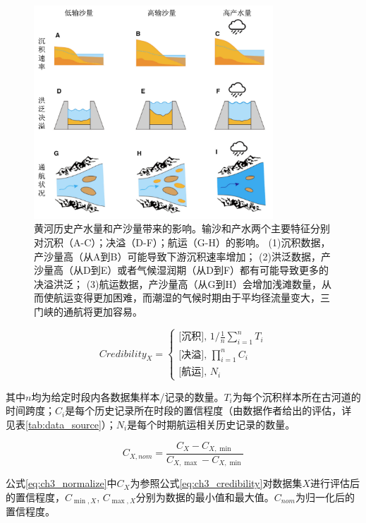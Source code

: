 \begin{figure}[!h] %
    \centering
    \includegraphics[width=0.8\textwidth]{img/ch3/ch3_impacts_diagram.png}
    \caption[黄河历史产水量和产沙量变化的影响]{黄河历史产水量和产沙量带来的影响。输沙和产水两个主要特征分别对沉积（A-C）；决溢（D-F）；航运（G-H）的影响。
    (1)沉积数据，产沙量高（从A到B）可能导致下游沉积速率增加\cite{xu2003,yeqingchao1994}；
    (2)洪泛数据，产沙量高（从D到E）或者气候湿润期（从D到F）都有可能导致更多的决溢洪泛\cite{chen2012}；
    (3)航运数据，产沙量高（从G到H）会增加浅滩数量，从而使航运变得更加困难，而潮湿的气候时期由于平均径流量变大，三门峡的通航将更加容易\cite{WangShouChun1993}。}\label{fig:ch3:impacts_diagram}
\end{figure}



\begin{equation}
    \label{eq:ch3_credibility}
    Credibility_X = 
    \left\{\begin{array}{l}
        \text{[沉积], } 1 / \frac{1}{n} \sum_{i=1}^n T_i\\
        \text{[决溢], } \prod_{i=1}^n C_i\\
        \text{[航运], } N_i
    \end{array}\right.
\end{equation}    

其中$n$均为给定时段内各数据集样本/记录的数量。$T_i$为每个沉积样本所在古河道的时间跨度；$C_i$是每个历史记录所在时段的置信程度（由数据作者给出的评估，详见表\ref{tab:data_source}）；$N_i$是每个时期航运相关历史记录的数量。

\begin{equation}
    \label{eq:ch3_normalize}
    C_{X, nom}=\frac{C_X-C_{X, \min}}{C_{X, \max}-C_{X, \min}}
\end{equation}

公式\ref{eq:ch3_normalize}中$C_{X}$为参照公式\ref{eq:ch3_credibility}对数据集$X$进行评估后的置信程度，$C_{\min, X}$, $C_{\max, X}$分别为数据的最小值和最大值。$C_{nom}$为归一化后的置信程度。
